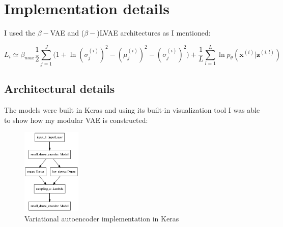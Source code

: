 \documentclass[12pt, english]{article}
\begin{document}
\newpage

\section{Implementation details}

\vspace{7mm}

\par I used the $\beta-$VAE and ($\beta-$)LVAE architectures as I mentioned:

\vspace{4mm}

\begin{equation}
    L_{i} \simeq \beta_{max}\frac{1}{2}\sum_{j = 1}^{J}\Big( 1 + \ln(\sigma^{(i)}_{j})^{2} - (\mu^{(i)}_{j})^{2} - (\sigma^{(i)}_{j})^{2} \Big) + \frac{1}{L}\sum_{l=1}^{L}\ln p_{\theta}(\bm{x}^{(i)} | \bm{z}^{(i, l)})
\end{equation}

\vspace{5mm}

\subsection{Architectural details}

\vspace{5mm}

\par The models were built in Keras \cite{chollet2015keras} and using its built-in visualization tool I was able to show how my modular VAE is constructed:

\vspace{4mm}

\begin{figure}[H]
    \centering
    \includegraphics[width=0.25\textwidth]{vae_keras.png}
    \caption{Variational autoencoder implementation in Keras}
\end{figure}

\vspace{4mm}
\end{document}
